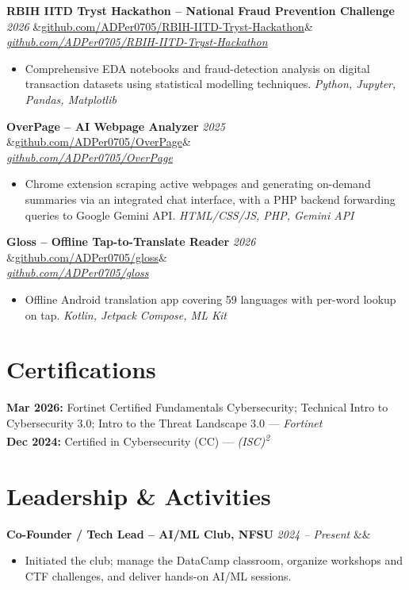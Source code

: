 \documentclass[9pt,a4paper]{extarticle}
\newcommand{\cventry}[3]{%
  \noindent\textbf{#1} \hfill \textit{\small #2}%
  \ifx&#3&\else\\\textit{\small\color{gray}#3}\fi%
}
\begin{document}
\cventry{RBIH IITD Tryst Hackathon -- National Fraud Prevention Challenge}{2026}{\href{https://github.com/ADPer0705/RBIH-IITD-Tryst-Hackathon}{github.com/ADPer0705/RBIH-IITD-Tryst-Hackathon}}
\begin{itemize}
  \item[\small$\bullet$] {\small Comprehensive EDA notebooks and fraud-detection analysis on digital transaction datasets using statistical modelling techniques. \textit{Python, Jupyter, Pandas, Matplotlib}}
\end{itemize}

\cventry{OverPage -- AI Webpage Analyzer}{2025}{\href{https://github.com/ADPer0705/OverPage}{github.com/ADPer0705/OverPage}}
\begin{itemize}
  \item[\small$\bullet$] {\small Chrome extension scraping active webpages and generating on-demand summaries via an integrated chat interface, with a PHP backend forwarding queries to Google Gemini API. \textit{HTML/CSS/JS, PHP, Gemini API}}
\end{itemize}

\cventry{Gloss -- Offline Tap-to-Translate Reader}{2026}{\href{https://github.com/ADPer0705/gloss}{github.com/ADPer0705/gloss}}
\begin{itemize}
  \item[\small$\bullet$] {\small Offline Android translation app covering 59 languages with per-word lookup on tap. \textit{Kotlin, Jetpack Compose, ML Kit}}
\end{itemize}

\section{Certifications}
{\small
\noindent\textbf{Mar 2026:} Fortinet Certified Fundamentals Cybersecurity; Technical Intro to Cybersecurity 3.0; Intro to the Threat Landscape 3.0 --- \textit{Fortinet} \\[1pt]
\noindent\textbf{Dec 2024:} Certified in Cybersecurity (CC) --- \textit{(ISC)\textsuperscript{2}}
}

\section{Leadership \& Activities}
\cventry{Co-Founder / Tech Lead -- AI/ML Club, NFSU}{2024 -- Present}{}
\begin{itemize}
  \item[\small$\bullet$] {\small Initiated the club; manage the DataCamp classroom, organize workshops and CTF challenges, and deliver hands-on AI/ML sessions.}
\end{itemize}
\end{document}
